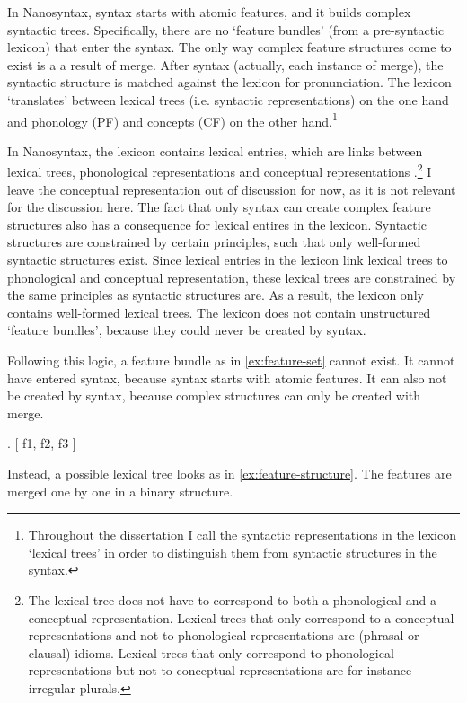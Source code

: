 In Nanosyntax, syntax starts with atomic features, and it builds complex syntactic trees. Specifically, there are no `feature bundles' (from a pre-syntactic lexicon) that enter the syntax. The only way complex feature structures come to exist is a a result of merge.
After syntax (actually, each instance of merge), the syntactic structure is matched against the lexicon for pronunciation. The lexicon `translates' between lexical trees (i.e. syntactic representations) on the one hand and phonology (PF) and concepts (CF) on the other hand.\footnote{
Throughout the dissertation I call the syntactic representations in the lexicon `lexical trees' in order to distinguish them from syntactic structures in the syntax.
}

In Nanosyntax, the lexicon contains lexical entries, which are links between lexical trees, phonological representations and conceptual representations \citep{starke2014}.\footnote{
The lexical tree does not have to correspond to both a phonological and a conceptual representation. Lexical trees that only correspond to a conceptual representations and not to phonological representations are (phrasal or clausal) idioms. Lexical trees that only correspond to phonological representations but not to conceptual representations are for instance irregular plurals.
} I leave the conceptual representation out of discussion for now, as it is not relevant for the discussion here. The fact that only syntax can create complex feature structures also has a consequence for lexical entires in the lexicon.
Syntactic structures are constrained by certain principles, such that only well-formed syntactic structures exist. Since lexical entries in the lexicon link lexical trees to phonological and conceptual representation, these lexical trees are constrained by the same principles as syntactic structures are.
As a result, the lexicon only contains well-formed lexical trees. The lexicon does not contain unstructured `feature bundles', because they could never be created by syntax.

Following this logic, a feature bundle as in \ref{ex:feature-set} cannot exist. It cannot have entered syntax, because syntax starts with atomic features. It can also not be created by syntax, because complex structures can only be created with merge.

\ex. [ \ac{f}1, \ac{f}2, \ac{f}3 ]\label{ex:feature-set}

Instead, a possible lexical tree looks as in \ref{ex:feature-structure}. The features are merged one by one in a binary structure.

